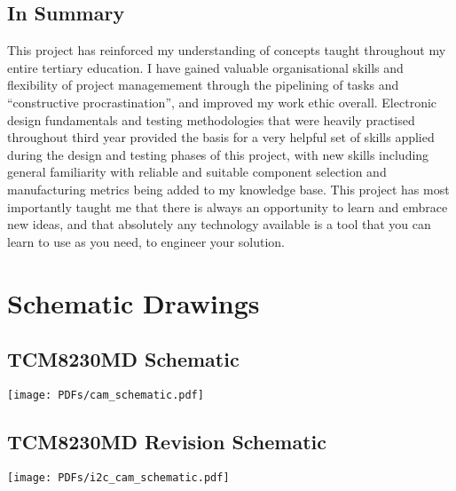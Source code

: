 \documentclass[11pt, a4paper, oneside]{Thesis} %
\begin{document}
\section{In Summary}
This project has reinforced my understanding of concepts taught throughout my entire tertiary education. I have gained valuable organisational skills and flexibility of project managemement through the pipelining of tasks and ``constructive procrastination'', and improved my work ethic overall. Electronic design fundamentals and testing methodologies that were heavily practised throughout third year provided the basis for a very helpful set of skills applied during the design and testing phases of this project, with new skills including general familiarity with reliable and suitable component selection and manufacturing metrics being added to my knowledge base. This project has most importantly taught me that there is always an opportunity to learn and embrace new ideas, and that absolutely any technology available is a tool that you can learn to use as you need, to engineer your solution.  



\appendix %



\chapter{Schematic Drawings} %
\label{AppendixA} %

\section{TCM8230MD Schematic}
\begin{center}
\texttt{[image: PDFs/cam\_schematic.pdf]}
\end{center}

\section{TCM8230MD Revision Schematic}
\begin{center}
\texttt{[image: PDFs/i2c\_cam\_schematic.pdf]}
\end{center}
\end{document}
